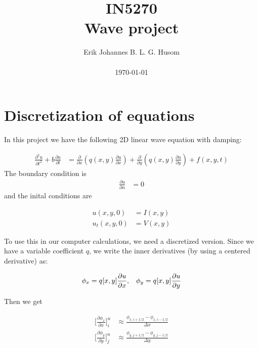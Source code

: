 \documentclass[10pt, a4paper]{amsart}
\title[IN5270 Wave project]{IN5270 \\ \large
Wave project}
\author[Husom]{Erik Johannes B. L. G. Husom \\ \\ \today}
\numberwithin{figure}{section}
\numberwithin{table}{section}
\begin{document}
\maketitle


\tableofcontents



\section{Discretization of equations}

In this project we have the following 2D linear wave equation with damping:

\begin{align}
    \label{eq:wave}
\frac{\partial^2 u}{\partial t^2} + b \frac{\partial u}{\partial t} &=
\frac{\partial}{\partial x}\left( q(x,y) \frac{\partial u}{\partial x} \right)
    + \frac{\partial}{\partial y} \left( q(x,y) \frac{\partial u}{\partial
            y}\right) + f(x,y,t)
\end{align}
The boundary condition is
\begin{align}
\frac{\partial u}{\partial n} &= 0
\end{align}
and the inital conditions are

\begin{align}
u(x,y,0) &= I(x,y) \\
u_t(x,y,0) &= V(x,y)
\end{align}

To use this in our computer calculations, we need a discretized version. Since
we have a variable coefficient $q$, we write the inner derivatives (by using a
centered derivative) as:

\begin{align}
    \phi_x = q[x,y] \frac{\partial u}{\partial x}, \hspace{0.3cm}\phi_y =
    q[x,y] \frac{\partial u}{\partial y}
\end{align}

Then we get

\begin{align}
    \big[ \frac{\partial \phi_x}{\partial x}\big]_i^n &\approx \frac{\phi_{x,
    i+1/2} - \phi_{x,i-1/2}}{\Delta x} \\
    \big[ \frac{\partial \phi_y}{\partial y}\big]_j^n &\approx \frac{\phi_{y,
    j+1/2} - \phi_{y,j-1/2}}{\Delta y}
\end{align}
\end{document}
